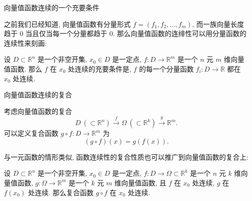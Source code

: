 
\begin{frame}{向量值函数连续的一个充要条件}

之前我们已经知道, 向量值函数有分量形式 $f = (f_1, f_2, \dots, f_m)$, 而一族向量长度趋于 $0$ 当且仅当每一个分量都趋于 $0$. 那么向量值函数的连绯性可以用分量函数的连续性来刻画:

\pause
\vspace{1em}

\begin{thm}
设 $D \subset \mathbb{R}^n$ 是一个非空开集, $x_0 \in D$ 是一定点, $f: D \to \mathbb{R}^m$ 是一个 $n$ 元 $m$ 维向量值函数.
那么 $f$ 在 $x_0$ 处连续的充要条件是, $f$ 的每一个分量函数 $f_i: D \to \mathbb{R}$ 都在 $x_0$ 处连续.
\end{thm}

\end{frame}


\begin{frame}{向量值函数连续的复合}

考虑向量值函数的复合
\[D ~ (\subset \mathbb{R}^n) \xrightarrow{f} \Omega ~ (\subset \mathbb{R}^k) \xrightarrow{g} \mathbb{R}^m.\]
可以定义复合函数 $g \circ f: D \to \mathbb{R}^m$ 为
\[(g \circ f)(x) = g(f(x)).\]

\pause
\vspace{1em}

与一元函数的情形类似, 函数连续性的复合性质也可以推广到向量值函数的复合上:

\pause

\begin{thm}
设 $D \subset \mathbb{R}^n$ 是一个非空开集, $x_0 \in D$ 是一定点, $f: D \to \Omega \subset \mathbb{R}^k$ 是一个 $n$ 元 $k$ 维向量值函数, $g: \Omega \to \mathbb{R}^m$ 是一个 $k$ 元 $m$ 维向量值函数, 且 $f$ 在 $x_0$ 处连续, $g$ 在 $f(x_0)$ 处连续. 那么复合函数 $g \circ f$ 在 $x_0$ 处连续.
\end{thm}

\end{frame}


